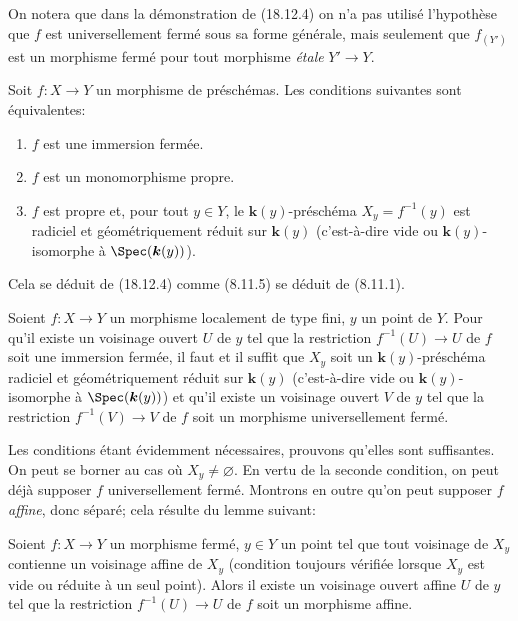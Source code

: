 \begin{remark}[18.12.5]
\label{IV.18.12.5}
On notera que dans la démonstration de (18.12.4) on n'a pas utilisé l'hypothèse que $f$ est universellement fermé sous sa forme générale, mais seulement que $f_{(Y')}$ est un morphisme fermé pour tout morphisme \emph{étale} $Y'\to Y$.
\end{remark}

\begin{corollary}[18.12.6]
\label{IV.18.12.6}
Soit $f:X\to Y$ un morphisme de préschémas. Les conditions suivantes sont équivalentes:
\begin{enumerate}
  \item[\textup{a)}] $f$ est une immersion fermée.
  \item[\textup{b)}] $f$ est un monomorphisme propre.
  \item[\textup{c)}] $f$ est propre et, pour tout $y\in Y$, le $\boldsymbol{k}(y)$-préschéma $X_y=f^{-1}(y)$ est radiciel et géométriquement réduit sur $\boldsymbol{k}(y)$ (c'est-à-dire vide ou $\boldsymbol{k}(y)$-isomorphe à $\Spec(\boldsymbol{k}(y))$).
\end{enumerate}
\end{corollary}

Cela se déduit de (18.12.4) comme (8.11.5) se déduit de (8.11.1).

\begin{proposition}[18.12.7]
\label{IV.18.12.7}
Soient $f:X\to Y$ un morphisme localement de type fini, $y$ un point de $Y$. Pour qu'il existe un voisinage ouvert $U$ de $y$ tel que la restriction $f^{-1}(U)\to U$ de $f$ soit une immersion fermée, il faut et il suffit que $X_y$ soit un $\boldsymbol{k}(y)$-préschéma radiciel et géométriquement réduit sur $\boldsymbol{k}(y)$ (c'est-à-dire vide ou $\boldsymbol{k}(y)$-isomorphe à $\Spec(\boldsymbol{k}(y))$) et qu'il existe un voisinage ouvert $V$ de $y$ tel que la restriction $f^{-1}(V)\to V$ de $f$ soit un morphisme universellement fermé.
\end{proposition}

Les conditions étant évidemment nécessaires, prouvons qu'elles sont suffisantes. On peut se borner au cas où $X_y\neq\varnothing$. En vertu de la seconde condition, on peut déjà supposer $f$ universellement fermé. Montrons en outre qu'on peut supposer $f$ \emph{affine}, donc séparé; cela résulte du lemme suivant:

\begin{lemma}[18.12.7.1]
\label{IV.18.12.7.1}
Soient $f:X\to Y$ un morphisme fermé, $y\in Y$ un point tel que tout voisinage de $X_y$ contienne un voisinage affine de $X_y$ (condition toujours vérifiée lorsque $X_y$ est vide ou réduite à un seul point). Alors il existe un voisinage ouvert affine $U$ de $y$ tel que la restriction $f^{-1}(U)\to U$ de $f$ soit un morphisme affine.
\end{lemma}

